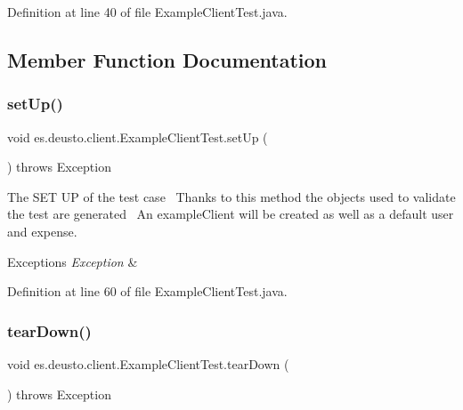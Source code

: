 Definition at line 40 of file Example\+Client\+Test.\+java.



\subsection{Member Function Documentation}
\mbox{\label{classes_1_1deusto_1_1client_1_1_example_client_test_a61fde1da201769cbe17f77b8772eeeb7}} 
\subsubsection{\texorpdfstring{set\+Up()}{setUp()}}
{\footnotesize\ttfamily void es.\+deusto.\+client.\+Example\+Client\+Test.\+set\+Up (\begin{DoxyParamCaption}{ }\end{DoxyParamCaption}) throws Exception}

The S\+ET UP of the test case~\newline
Thanks to this method the objects used to validate the test are generated~\newline
An example\+Client will be created as well as a default user and expense. 
\begin{DoxyExceptions}{Exceptions}
{\em Exception} & \\
\hline
\end{DoxyExceptions}


Definition at line 60 of file Example\+Client\+Test.\+java.

\mbox{\label{classes_1_1deusto_1_1client_1_1_example_client_test_ab3c56961d74c443c19c172674e7503e1}} 
\subsubsection{\texorpdfstring{tear\+Down()}{tearDown()}}
{\footnotesize\ttfamily void es.\+deusto.\+client.\+Example\+Client\+Test.\+tear\+Down (\begin{DoxyParamCaption}{ }\end{DoxyParamCaption}) throws Exception}

